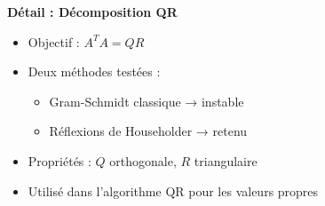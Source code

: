 \textbf{Détail : Décomposition QR}

\vspace{0.5em}

\begin{itemize}
  \item Objectif : \( A^T A = Q R \)
  \item Deux méthodes testées :
  \begin{itemize}
    \item Gram-Schmidt classique → \xmark instable
    \item Réflexions de Householder → \cmark retenu
  \end{itemize}
  \item Propriétés : \( Q \) orthogonale, \( R \) triangulaire
  \item Utilisé dans l'algorithme QR pour les valeurs propres
\end{itemize}